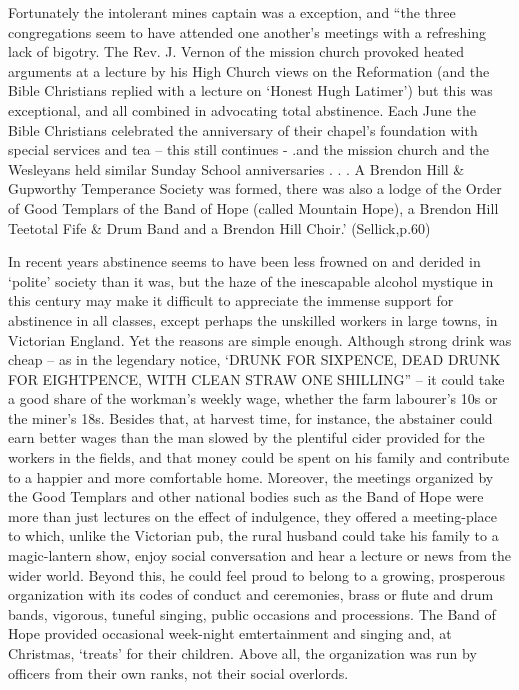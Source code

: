 \documentclass[10pt,a4paper]{article}
\begin{document}
Fortunately the intolerant mines captain was a exception, and “the three congregations seem to have attended one another’s meetings with a refreshing lack of bigotry. The Rev. J.     Vernon of the mission church provoked heated arguments at a lecture by his High Church views on the Reformation (and the Bible Christians replied with a lecture on ‘Honest Hugh Latimer’) but this was exceptional, and all combined in advocating total abstinence. Each June the Bible Christians celebrated the anniversary of their chapel’s foundation with special services and tea – this still continues - .and the mission church and the Wesleyans held similar Sunday School anniversaries . . .   A Brendon Hill \& Gupworthy Temperance Society  was formed, there was also a lodge of the Order of Good Templars of the Band of Hope (called Mountain Hope), a Brendon Hill Teetotal Fife \& Drum Band and a Brendon Hill Choir.’ (Sellick,p.60)

In recent years abstinence seems to have been less frowned on and derided in ‘polite’ society than it was, but the haze of the inescapable alcohol mystique in this century may make it difficult to appreciate the immense support for abstinence in all classes, except perhaps the unskilled workers in large towns, in Victorian England. Yet the reasons are simple enough. Although strong drink was cheap – as in the legendary notice, ‘DRUNK FOR SIXPENCE, DEAD DRUNK FOR EIGHTPENCE, WITH CLEAN STRAW ONE SHILLING” – it could take a good share of the workman’s weekly wage, whether the farm labourer’s 10s or the miner’s 18s. Besides that, at harvest time,  for instance, the abstainer  could earn better wages than the man slowed by the plentiful  cider provided for the workers in the fields, and that money could be spent on his family and contribute to a happier and more comfortable home. Moreover, the meetings organized by the Good Templars and other national bodies such as the Band of Hope were more than just lectures on the effect of indulgence, they offered a meeting-place to which, unlike the Victorian pub, the rural husband could take his family to a magic-lantern show, enjoy social conversation and hear a lecture or news from the wider world. Beyond this, he could feel proud to belong to a growing, prosperous organization with its codes of conduct and ceremonies, brass or flute and drum bands, vigorous, tuneful singing, public occasions and processions. The Band of Hope provided occasional week-night emtertainment and singing and, at Christmas, ‘treats’ for their children.  Above all, the organization was run by officers from their own ranks, not their social overlords. 
\end{document}
